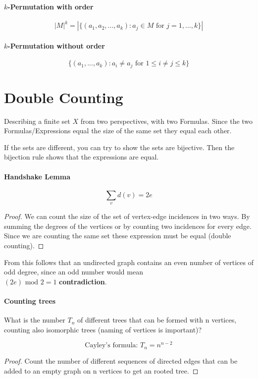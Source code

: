 \documentclass[a4paper]{article}
\begin{document}
\paragraph{$k$-Permutation with order}
$$ |M|^k = |\{(a_1,a_2,...,a_k): a_j \in M \text{ for } j = 1,...,k\}| $$

\paragraph{$k$-Permutation without order}
$$ \{(a_1,...,a_k): a_i \neq a_j \text{ for } 1 \leq i \neq j \leq k\} $$

\section{Double Counting}
Describing a finite set $ X $ from two perspectives, with two Formulas.
Since the two Formulas/Expressions equal the size of the same set they equal each other.

\smallskip
If the sets are different, you can try to show the sets are bijective.
Then the bijection rule shows that the expressions are equal.

\paragraph{Handshake Lemma}
$$ \sum_v d(v) = 2e $$ 

\begin{proof}
    We can count the size of the set of vertex-edge incidences in two ways.
    By summing the degrees of the vertices or by counting two incidences for every edge.
    Since we are counting the same set these expression must be equal (double counting).
\end{proof}

\smallskip
From this follows that an undirected graph contains an even number of 
vertices of odd degree, since an odd number would mean \\ $ (2e) \text{ mod } 2 = 1 $ 
\textbf{contradiction}. 

\paragraph{Counting trees}
What is the number $ T_n $ of different trees that can be formed with n vertices,
counting also isomorphic trees (naming of vertices is important)?

$$ \text{Cayley's formula: } T_n = n^{n - 2} $$ 
\begin{proof}
Count the number of different sequences of directed edges that can be added to an empty
graph on n vertices to get an rooted tree.


\end{proof}
\end{document}
